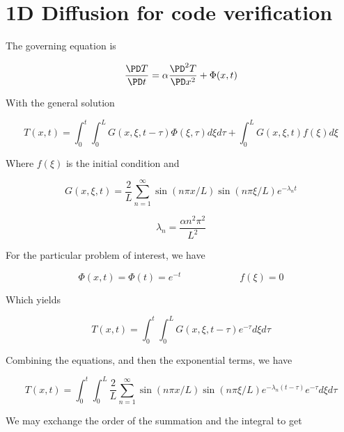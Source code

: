 \documentclass[11pt]{article}
\begin{document}
\doublespacing
\MOONSTITLE
\maketitle

\section{1D Diffusion for code verification}
The governing equation is

\begin{equation}
	\frac{\PD T}{\PD t} = \alpha \frac{\PD^2 T}{\PD x^2} + \Phi(x,t)
\end{equation}

With the general solution

\begin{equation}
	T(x,t) = \int_0^t \int_0^L G(x,\xi,t-\tau) \Phi(\xi,\tau) d\xi d\tau
	+
	\int_0^L G(x,\xi,t) f(\xi) d\xi
\end{equation}

Where $f(\xi)$ is the initial condition and

\begin{equation}
	G(x,\xi,t) = \frac{2}{L} \sum_{n=1}^{\infty}
	\sin(n\pi x/L)
	\sin(n\pi \xi/L)
	e^{-\lambda_n t}
\end{equation}

\begin{equation}
	\lambda_n = \frac{\alpha n^2\pi^2}{L^2}
\end{equation}

For the particular problem of interest, we have

\begin{equation}
	\Phi(x,t) = \Phi(t) = e^{-t} \qquad \qquad \qquad f(\xi) = 0
\end{equation}

Which yields

\begin{equation}
	T(x,t) = \int_0^t \int_0^L G(x,\xi,t-\tau) e^{-\tau} d\xi d\tau
\end{equation}

Combining the equations, and then the exponential terms, we have

\begin{equation}
	T(x,t) = \int_0^t \int_0^L
	\frac{2}{L} \sum_{n=1}^{\infty}
	\sin(n\pi x/L)
	\sin(n\pi \xi/L)
	e^{-\lambda_n (t-\tau)}
	e^{-\tau}
	d\xi d\tau
\end{equation}

We may exchange the order of the summation and the integral to get
\end{document}
